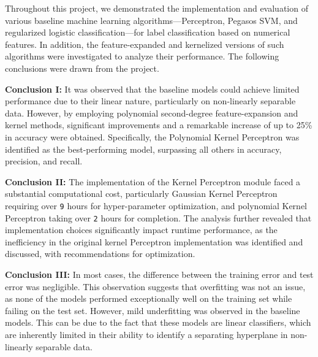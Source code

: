 
Throughout this project, we demonstrated the implementation and evaluation of various baseline machine learning algorithms—Perceptron, Pegasos SVM, and regularized logistic classification—for label classification based on numerical features. In addition, the feature-expanded and kernelized versions of such algorithms were investigated to analyze their performance. The following conclusions were drawn from the project.

{\bf Conclusion I:} It was observed that the baseline models could achieve limited performance due to their linear nature, particularly on non-linearly separable data. However, by employing polynomial second-degree feature-expansion and kernel methods, significant improvements and a remarkable increase of up to 25\% in accuracy were obtained. Specifically, the Polynomial Kernel Perceptron was identified as the best-performing model, surpassing all others in accuracy, precision, and recall.

{\bf Conclusion II:} The implementation of the Kernel Perceptron module faced a substantial computational cost, particularly Gaussian Kernel Perceptron requiring over \texttt{9} hours for hyper-parameter optimization, and polynomial Kernel Perceptron taking over \texttt{2} hours for completion. The analysis further revealed that implementation choices significantly impact runtime performance, as the inefficiency in the original kernel Perceptron implementation was identified and discussed, with recommendations for optimization.

{\bf Conclusion III:} In most cases, the difference between the training error and test error was negligible. This observation suggests that overfitting was not an issue, as none of the models performed exceptionally well on the training set while failing on the test set. However, mild underfitting was observed in the baseline models. This can be due to the fact that these models are linear classifiers, which are inherently limited in their ability to identify a separating hyperplane in non-linearly separable data.